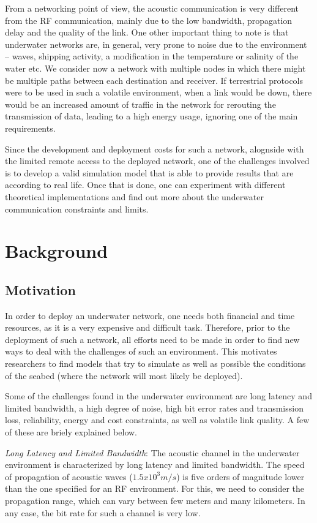 \documentclass[a4paper]{IEEEtran}
\begin{document}
From a networking point of view, the acoustic communication is very different
from the RF communication, mainly due to the low bandwidth, propagation delay
and the quality of the link. One other important thing to note is that
underwater networks are, in general, very prone to noise due to the environment
-- waves, shipping activity, a modification in the temperature or salinity of
the water etc. We consider now a network with multiple nodes in which there
might be multiple paths between each destination and receiver. If terrestrial
protocols were to be used in such a volatile environment, when a link would be
down, there would be an increased amount of traffic in the network for rerouting
the transmission of data, leading to a high energy usage, ignoring one of the
main requirements.

Since the development and deployment costs for such a network, alognside with
the limited remote access to the deployed network,  one of the challenges
involved is to develop a valid simulation model that is able to provide results
that are according to real life. Once that is done, one can experiment with
different theoretical implementations and find out more about the underwater
communication constraints and limits.

\section{Background}
\subsection{Motivation}
In order to deploy an underwater network, one needs both financial and time
resources, as it is a very expensive and difficult task. Therefore, prior to the
deployment of such a network, all efforts need to be made in order to find new
ways to deal with the challenges of such an environment. This motivates
researchers to find models that try to simulate as well as possible the
conditions of the seabed (where the network will most likely be deployed).

Some of the challenges found in the underwater environment are long latency and
limited bandwidth, a high degree of noise, high bit error rates and transmission
loss, reliability, energy and cost constraints, as well as volatile link
quality. A few of these are briely explained below.

\textit{Long Latency and Limited Bandwidth}: The acoustic channel in the
underwater environment is characterized by long latency and limited bandwidth.
The speed of propagation of acoustic waves ($1.5 x 10^3 m/s$) is five orders of
magnitude lower than the one specified for an RF environment. For this, we need
to consider the propagation range, which can vary between few meters and many
kilometers. In any case, the bit rate for such a channel is very low.
\end{document}
